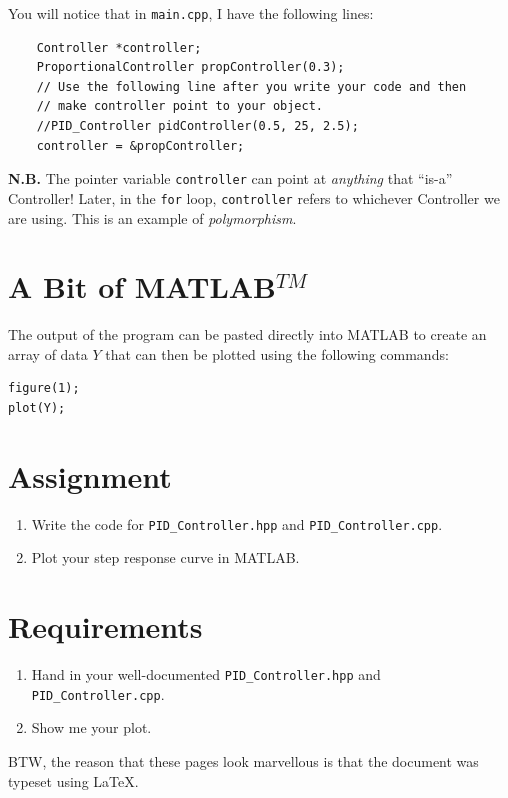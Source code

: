\documentclass[12pt]{article}
\begin{document}
You will notice that in \texttt{main.cpp}, I have the following lines:
\begin{verbatim}
    Controller *controller;
    ProportionalController propController(0.3);
    // Use the following line after you write your code and then 
    // make controller point to your object.
    //PID_Controller pidController(0.5, 25, 2.5);               
    controller = &propController;
 \end{verbatim}
{\bf N.B.} The pointer variable \texttt{controller} can point at \emph{anything} that ``is-a'' Controller!  Later, in the \texttt{for} loop, 
\texttt{controller} refers to whichever Controller we are using.  This is an example of \emph{polymorphism}.

\section{A Bit of MATLAB$^{TM}$}
The output of the program can be pasted directly  into MATLAB to create an array of data $Y$ that can then be plotted using the following commands:
\begin{verbatim}
figure(1);
plot(Y);
\end{verbatim}

\section{Assignment}
\begin{enumerate}
\item Write the code for \texttt{PID\_Controller.hpp} and \texttt{PID\_Controller.cpp}.
\item Plot your step response curve in MATLAB.
\end{enumerate}

\section{Requirements}
\begin{enumerate}
\item Hand in your well-documented \texttt{PID\_Controller.hpp} and \texttt{PID\_Controller.cpp}.
\item Show me your plot.
\end{enumerate}
BTW, the reason that these pages look marvellous is that the document was typeset using \LaTeX.
\end{document}
